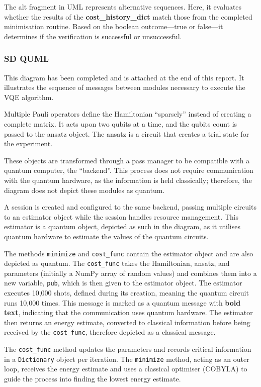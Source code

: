 \documentclass{article}
\begin{document}
The alt fragment in UML represents alternative sequences\cite{Seidl_Scholz_Huemer_Kappel_Duffy_2014}. Here, it evaluates whether the results of the \textbf{cost\_history\_dict} match those from the completed minimisation routine. Based on the boolean outcome—true or false—it determines if the verification is successful or unsuccessful.

\subsubsection{SD QUML}

This diagram has been completed and is attached at the end of this report. It illustrates the sequence of messages between modules necessary to execute the VQE algorithm. 

Multiple Pauli operators define the Hamiltonian “sparsely” instead of creating a complete matrix. It acts upon two qubits at a time, and the qubits count is passed to the ansatz object. The ansatz is a circuit that creates a trial state for the experiment. 

These objects are transformed through a pass manager to be compatible with a quantum computer, the “backend”. This process does not require communication with the quantum hardware, as the information is held classically; therefore, the diagram does not depict these modules as quantum.

A session is created and configured to the same backend, passing multiple circuits to an estimator object while the session handles resource management. This estimator is a quantum object, depicted as such in the diagram, as it utilises quantum hardware to estimate the values of the quantum circuits. 

The methods \texttt{minimize} and \texttt{cost\_func} contain the estimator object and are also depicted as quantum. The \texttt{cost\_func} takes the Hamiltonian, ansatz, and parameters (initially a NumPy array of random values) and combines them into a new variable, \texttt{pub}, which is then given to the estimator object. The estimator executes 10,000 shots, defined during its creation, meaning the quantum circuit runs 10,000 times. This message is marked as a quantum message with \textbf{bold text}, indicating that the communication uses quantum hardware. The estimator then returns an energy estimate, converted to classical information before being received by the \texttt{cost\_func}, therefore depicted as a classical message.

The \texttt{cost\_func} method updates the parameters and records critical information in a \texttt{Dictionary} object per iteration. The \texttt{minimize} method, acting as an outer loop, receives the energy estimate and uses a classical optimiser (COBYLA) to guide the process into finding the lowest energy estimate.
\end{document}
